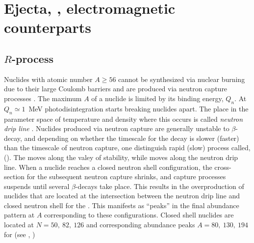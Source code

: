 \section{Ejecta, \nuc{}, electromagnetic counterparts}

\subsection{$R$-process \nuc{}} \label{sec:intro:nucleo}

Nuclides with atomic number  $A{\geq}56$ cannot be synthesized via nuclear burning 
due to their large Coulomb barriers and are produced via 
neutron capture processes \citep{Burbidge:1957}.
The maximum $A$ of a nuclide is limited by its binding energy, $Q_n$. 
At $Q_n{\simeq1}$~MeV photodisintegration starts breaking nuclides apart. 
The place in the parameter space of temperature and density where this occurs 
is called \textit{neutron drip line} \citep{Rolfs:1988}.
Nuclides produced via neutron capture are generally unstable to $\beta$-decay,
and depending on whether the timescale for the decay is slower (faster) than 
the timescale of neutron capture, one distinguish rapid (slow) process called,
\rproc{} (\sproc{}).
%
The \sproc{} moves along the valey of stability, while \rproc{} moves along the 
neutron drip line.
%
When a nuclide reaches a closed neutron shell configuration, the cross-section 
for the subsequent neutron capture shrinks, and capture processes suspends until 
several $\beta$-decays take place. This results in the overproduction of nuclides 
that are located at the intersection between the neutron drip line and closed 
neutron shell for the \rproc{}. This manifests as ``peaks'' in the final abundance 
pattern at $A$ corresponding to these configurations.
Closed shell nuclides are located at $N=50,\: 82, \: 126$ and 
corresponding abundance peaks $A=80,\:130,\:194$ for \rproc{} 
(see \eg, \citet{Arnould:2007gh})

